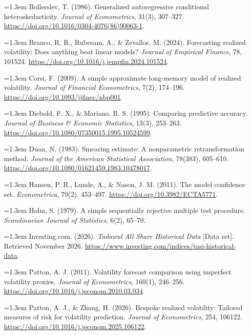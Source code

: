 \noindent\hangindent=1.3em Bollerslev, T. (1986). Generalized autoregressive conditional heteroskedasticity. \emph{Journal of Econometrics}, 31(3), 307--327. \url{https://doi.org/10.1016/0304-4076(86)90063-1}.

\noindent\hangindent=1.3em Branco, R. R., Rubesam, A., \& Zevallos, M. (2024). Forecasting realized volatility: Does anything beat linear models? \emph{Journal of Empirical Finance}, 78, 101524. \url{https://doi.org/10.1016/j.jempfin.2024.101524}.

\noindent\hangindent=1.3em Corsi, F. (2009). A simple approximate long-memory model of realized volatility. \emph{Journal of Financial Econometrics}, 7(2), 174--196. \url{https://doi.org/10.1093/jjfinec/nbp001}.

\noindent\hangindent=1.3em Diebold, F. X., \& Mariano, R. S. (1995). Comparing predictive accuracy. \emph{Journal of Business \& Economic Statistics}, 13(3), 253--263. \url{https://doi.org/10.1080/07350015.1995.10524599}.

\noindent\hangindent=1.3em Duan, N. (1983). Smearing estimate: A nonparametric retransformation method. \emph{Journal of the American Statistical Association}, 78(383), 605--610. \url{https://doi.org/10.1080/01621459.1983.10478017}.

\noindent\hangindent=1.3em Hansen, P. R., Lunde, A., \& Nason, J. M. (2011). The model confidence set. \emph{Econometrica}, 79(2), 453--497. \url{https://doi.org/10.3982/ECTA5771}.

\noindent\hangindent=1.3em Holm, S. (1979). A simple sequentially rejective multiple test procedure. \emph{Scandinavian Journal of Statistics}, 6(2), 65--70.

\noindent\hangindent=1.3em Investing.com. (2026). \emph{Tadawul All Share Historical Data} [Data set]. Retrieved November 2026. \url{https://www.investing.com/indices/tasi-historical-data}.

\noindent\hangindent=1.3em Patton, A. J. (2011). Volatility forecast comparison using imperfect volatility proxies. \emph{Journal of Econometrics}, 160(1), 246--256. \url{https://doi.org/10.1016/j.jeconom.2010.03.034}.

\noindent\hangindent=1.3em Patton, A. J., \& Zhang, H. (2026). Bespoke realized volatility: Tailored measures of risk for volatility prediction. \emph{Journal of Econometrics}, 254, 106122. \url{https://doi.org/10.1016/j.jeconom.2025.106122}.

